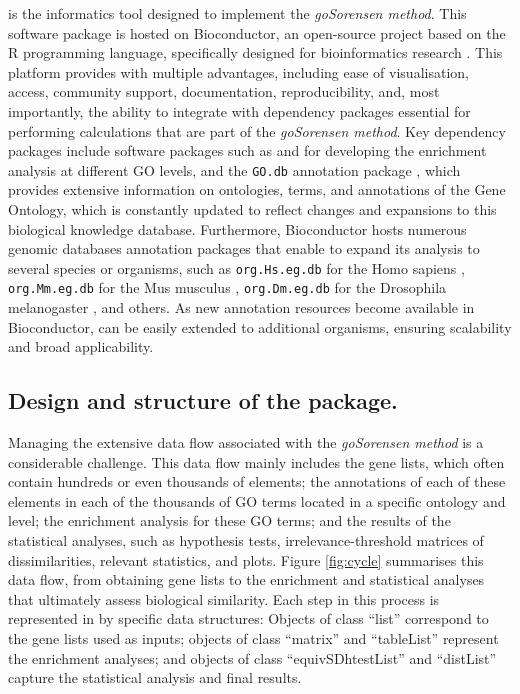  is the informatics tool designed to implement the \emph{goSorensen method}. This software package is hosted on Bioconductor, an open-source project based on the R programming language, specifically designed for bioinformatics research \citep{gentleman2004bioconductor}. This platform provides  with multiple advantages, including ease of visualisation, access, community support, documentation, reproducibility, and, most importantly, the ability to integrate with dependency packages essential for performing calculations that are part of the \emph{goSorensen method}. Key dependency packages include software packages such as  \citep{clusterProfiler1, clusterProfiler2} and  \citep{goProfiles} for developing the enrichment analysis at different GO levels, and the \texttt{GO.db} annotation package \citep{GOPackage}, which provides extensive information on ontologies, terms, and annotations of the Gene Ontology, which is constantly updated to reflect changes and expansions to this biological knowledge database. Furthermore, Bioconductor hosts numerous genomic databases annotation packages that enable  to expand its analysis to several species or organisms, such as \texttt{org.Hs.eg.db} for the Homo sapiens \citep{humansorg}, \texttt{org.Mm.eg.db} for the Mus musculus \citep{mouseorg}, \texttt{org.Dm.eg.db} for the Drosophila melanogaster \citep{flyorg}, and others. As new annotation resources become available in Bioconductor,  can be easily extended to additional organisms, ensuring scalability and broad applicability.

\hypertarget{design-and-structure-of-the-package.}{%
\subsection{\texorpdfstring{Design and structure of the  package.}{Design and structure of the  package.}}\label{design-and-structure-of-the-package.}}

Managing the extensive data flow associated with the \emph{goSorensen method} is a considerable challenge. This data flow mainly includes the gene lists, which often contain hundreds or even thousands of elements; the annotations of each of these elements in each of the thousands of GO terms located in a specific ontology and level; the enrichment analysis for these GO terms; and the results of the statistical analyses, such as hypothesis tests, irrelevance-threshold matrices of dissimilarities, relevant statistics, and plots.
Figure \ref{fig:cycle} summarises this data flow, from obtaining gene lists to the enrichment and statistical analyses that ultimately assess biological similarity. Each step in this process is represented in  by specific data structures: Objects of class ``list'' correspond to the gene lists used as inputs; objects of class ``matrix'' and ``tableList'' represent the enrichment analyses; and objects of class ``equivSDhtestList'' and ``distList'' capture the statistical analysis and final results.

